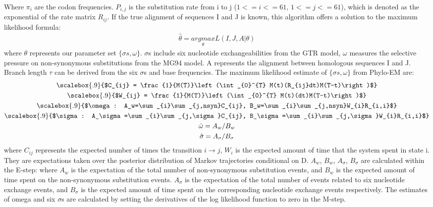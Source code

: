 \noindent Where $\pi_i$ are the codon frequencies. $P_{i,j}$ is the substitution rate from i to j ($1 <= i <= 61$, $1 <= j <= 61$), which is denoted as the exponential of the rate matrix $R_{ij}$. If the true alignment of sequences I and J is known, this algorithm offers a solution to the maximum likelihood formula: 
\begin{gather*}
\hat{\theta} = \underset{\theta}{argmax}L(I,J,A|\theta)
\end{gather*}
where $\theta$ represents our parameter set $\{\sigma s, \omega\}$. $\sigma$s include six nucleotide exchangeabilities from the GTR model, $\omega$ measures the selective pressure on non-synonymous substitutions from the MG94 model. A represents the alignment between homologous sequences I and J. Branch length $\tau$ can be derived from the six $\sigma$s and base frequencies. The maximum likelihood estimate of  $\{\sigma s, \omega\}$ from Phylo-EM are: 
\begin{gather*}
\scalebox{.9}{$C_{ij} = \frac{1}{M(T)}\left (\int_{0}^{T} M(t)(R_{ij}dt)M(T-t)\right )$}\\
\scalebox{.9}{$W_{ij} = \frac{1}{M(T)}\left (\int_{0}^{T} M(t)(dt)M(T-t)\right)$} \\
\scalebox{.9}{$\omega: A_w=\sum_{i}\sum_{j,nsyn}C_{ij}, B_w=\sum_{i}\sum_{j,nsyn}W_{i}R_{i,i}$}\\
\scalebox{.9}{$\sigma: A_\sigma=\sum_{i}\sum_{j,\sigma}C_{ij}, B_\sigma=\sum_{i}\sum_{j,\sigma}W_{i}R_{i,i}$}\\
\hat{\omega} = A_w/B_w \\
\hat{\sigma} = A_\sigma/B_\sigma
\end{gather*}
where $C_{ij}$ represents the expected number of times the transition $i \rightarrow j$, $W_{i}$ is the expected amount of time that the system spent in state i. They are expectations taken over the posterior distribution of Markov trajectories conditional on D. $A_w$, $B_w$, $A_\sigma$, $B_\sigma$ are calculated within the E-step: where $A_w$ is the expectation of the total number of non-synonymous substitution events, and $B_w$ is the expected amount of time spent on the non-synonymous substitution events. $A_\sigma$ is the expectation of the total number of events related to six nucleotide exchange events, and $B_\sigma$ is the expected amount of time spent on the corresponding nucleotide exchange events respectively. The estimates of omega and six $\sigma$s are calculated by setting the derivatives of the log likelihood function to zero in the M-step. 


